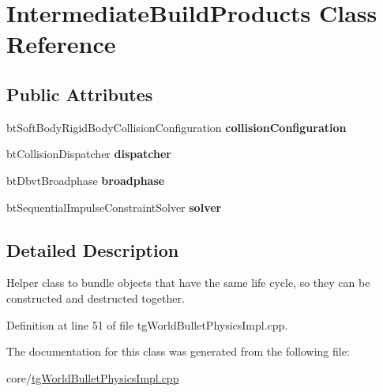 \hypertarget{class_intermediate_build_products}{\section{Intermediate\-Build\-Products Class Reference}
\label{class_intermediate_build_products}
}
\subsection*{Public Attributes}
\begin{DoxyCompactItemize}
\item 
\hypertarget{class_intermediate_build_products_a1c1e47aff53c708df5e885600977033b}{bt\-Soft\-Body\-Rigid\-Body\-Collision\-Configuration {\bfseries collision\-Configuration}}\label{class_intermediate_build_products_a1c1e47aff53c708df5e885600977033b}

\item 
\hypertarget{class_intermediate_build_products_a7f268a6fb6ac0164cc464c0ef61988e9}{bt\-Collision\-Dispatcher {\bfseries dispatcher}}\label{class_intermediate_build_products_a7f268a6fb6ac0164cc464c0ef61988e9}

\item 
\hypertarget{class_intermediate_build_products_a5b4cf3ae5ddd53191f1ff145c967d609}{bt\-Dbvt\-Broadphase {\bfseries broadphase}}\label{class_intermediate_build_products_a5b4cf3ae5ddd53191f1ff145c967d609}

\item 
\hypertarget{class_intermediate_build_products_a8fb8805a39b28c361335aeca2462ad63}{bt\-Sequential\-Impulse\-Constraint\-Solver {\bfseries solver}}\label{class_intermediate_build_products_a8fb8805a39b28c361335aeca2462ad63}

\end{DoxyCompactItemize}


\subsection{Detailed Description}
Helper class to bundle objects that have the same life cycle, so they can be constructed and destructed together. 

Definition at line 51 of file tg\-World\-Bullet\-Physics\-Impl.\-cpp.



The documentation for this class was generated from the following file\-:\begin{DoxyCompactItemize}
\item 
core/\hyperlink{tg_world_bullet_physics_impl_8cpp}{tg\-World\-Bullet\-Physics\-Impl.\-cpp}\end{DoxyCompactItemize}

